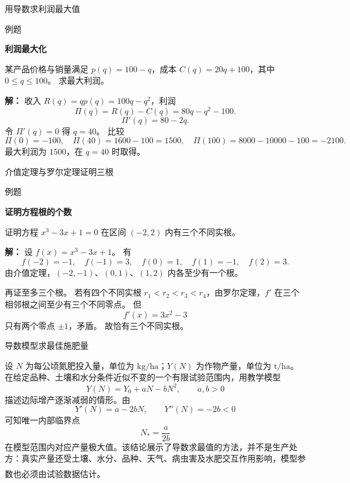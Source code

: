 \documentclass[aspectratio=169,10pt,fontset=fandol]{ctexbeamer}
\newcommand{\upcite}[1]{\textsuperscript{\textsuperscript{\cite{#1}}}}
\begin{document}
\begin{frame}[t,fragile]{用导数求利润最大值}
\normalsize
\begin{block}{例题}
{\normalsize
\textbf{利润最大化}\par

某产品价格与销量满足 $p(q)=100-q$，成本 $C(q)=20q+100$，其中 $0\leq q\leq100$。 求最大利润。

}
\end{block}
\pause
{\normalsize
\textbf{解：}
收入 $R(q)=qp(q)=100q-q^2$，利润
\[
\Pi(q)=R(q)-C(q)=80q-q^2-100.
\]
\[
\Pi'(q)=80-2q.
\]
令 $\Pi'(q)=0$ 得 $q=40$。 比较
\[
\Pi(0)=-100,\quad \Pi(40)=1600-100=1500,\quad \Pi(100)=8000-10000-100=-2100.
\]
最大利润为 $1500$，在 $q=40$ 时取得。

}
\end{frame}
\begin{frame}[t,fragile]{介值定理与罗尔定理证明三根}
\normalsize
\begin{block}{例题}
{\normalsize
\textbf{证明方程根的个数}\par

证明方程 $x^3-3x+1=0$ 在区间 $(-2,2)$ 内有三个不同实根。

}
\end{block}
\pause
{\normalsize
\textbf{解：}
设 $f(x)=x^3-3x+1$。 有
\[
f(-2)=-1,\quad f(-1)=3,\quad f(0)=1,\quad f(1)=-1,\quad f(2)=3.
\]
由介值定理，$(-2,-1)$、$(0,1)$、$(1,2)$ 内各至少有一个根。

再证至多三个根。 若有四个不同实根 $r_1<r_2<r_3<r_4$，由罗尔定理，$f'$ 在三个相邻根之间至少有三个不同零点。 但
\[
f'(x)=3x^2-3
\]
只有两个零点 $\pm1$，矛盾。 故恰有三个不同实根。

}
\end{frame}
\begin{frame}[t,fragile]{导数模型求最佳施肥量}
\normalsize
{\normalsize
\begin{application}[农业：简化的最佳施肥量模型]
设 $N$ 为每公顷氮肥投入量，单位为 $\mathrm{kg/ha}$；$Y(N)$ 为作物产量，单位为 $\mathrm{t/ha}$。在给定品种、土壤和水分条件近似不变的一个有限试验范围内，用教学模型
\[
Y(N)=Y_0+aN-bN^2,\qquad a,b>0
\]
描述边际增产逐渐减弱的情形。由
\[
Y'(N)=a-2bN,\qquad Y''(N)=-2b<0
\]
可知唯一内部临界点
\[
N_*=\frac{a}{2b}
\]
在模型范围内对应产量极大值。该结论展示了导数求最值的方法，并不是生产处方：真实产量还受土壤、水分、品种、天气、病虫害及水肥交互作用影响，模型参数也必须由试验数据估计。\upcite{TaizPlant}
\end{application}
}
\end{frame}
\end{document}
